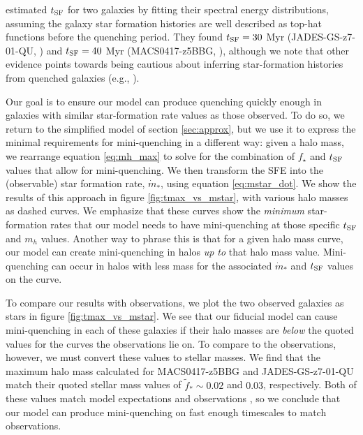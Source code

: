 \documentclass[a4paper,11pt]{article}
\begin{document}
\cite{Gelli2024} estimated $t_{\rm SF}$
for two galaxies by fitting their spectral energy distributions, assuming the galaxy star formation histories are well described as top-hat functions before the quenching period. They found $t_{\rm SF} = 30$ Myr (JADES-GS-z7-01-QU, \cite{Strait2023}) and $t_{\rm SF} = 40$ Myr (MACS0417-z5BBG, \cite{Looser2024}), although we note that other evidence points towards being cautious about inferring star-formation histories from quenched galaxies (e.g., \cite{Suess2022, Haskell2024, Narayanan2024}). 

Our goal is to ensure our model can produce quenching quickly enough in galaxies with similar star-formation rate values as those observed. To do so, we return to the simplified model of section \ref{sec:approx}, but we use it to express the minimal requirements for mini-quenching in a different way: given a halo mass, we rearrange equation \ref{eq:mh_max} to solve for the combination of $f_\star$ and $t_{\rm SF}$ values that allow for mini-quenching. We then transform the SFE into the (observable) star formation rate, $\dot{m}_{*}$, using equation \ref{eq:mstar_dot}. We show the results of this approach in figure \ref{fig:tmax_vs_mstar}, with various halo masses as dashed curves. We emphasize that these curves show the \textit{minimum} star-formation rates that our model needs to have mini-quenching at those specific $t_{\rm SF}$ and $m_{h}$ values. Another way to phrase this is that for a given halo mass curve, our model can create mini-quenching in halos \textit{up to} that halo mass value. Mini-quenching can occur in halos with less mass for the associated $\dot{m}_{*}$ and $t_{\rm SF}$ values on the curve. 

To compare our results with observations, we plot the two observed galaxies as stars in figure \ref{fig:tmax_vs_mstar}. We see that our fiducial model can cause mini-quenching in each of these galaxies if their halo masses are \textit{below} the quoted values for the curves the observations lie on. To compare to the observations, however, we must convert these values to stellar masses. We find that the maximum halo mass calculated for MACS0417-z5BBG and JADES-GS-z7-01-QU match their quoted stellar mass values of $\tilde{f}_{*} \sim 0.02$ and $0.03$, respectively. Both of these values match model expectations \cite{Diemer2015_colossus1, Furlanetto2017_minimalist, Prada2026} and observations \cite{Finkelstein2015}, so we conclude that our model can produce mini-quenching on fast enough timescales to match observations.
\end{document}
